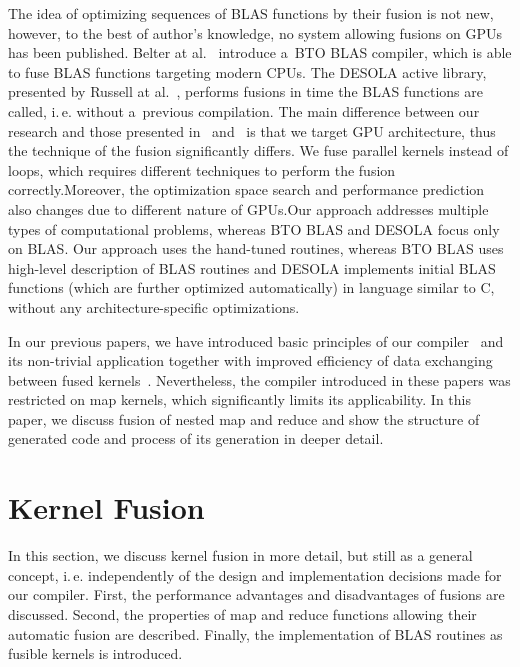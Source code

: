 \documentclass[final]{siamltex}
\def\ie{i.\,e.}
\begin{document}
The idea of optimizing sequences of BLAS functions by their fusion is not new, however, to the best of author's knowledge, no system allowing fusions on GPUs has been published. Belter at al.~\cite{belter2009automating} introduce a~BTO BLAS compiler, which is able to fuse BLAS functions targeting modern CPUs. The DESOLA active library, presented by Russell at al.~\cite{russell2011desola}, performs fusions  in time the BLAS functions are called, \ie{} without a~previous compilation. The main difference between our research and those presented in~\cite{belter2009automating} and~\cite{russell2011desola} is that we target GPU architecture, thus the technique of the fusion significantly differs. We fuse parallel kernels instead of loops, which requires different techniques to perform the fusion correctly.Moreover, the optimization space search and performance prediction also changes due to different nature of GPUs.Our approach addresses multiple types of computational problems, whereas BTO BLAS and DESOLA focus only on BLAS. Our approach uses the hand-tuned routines, whereas BTO BLAS uses high-level description of BLAS routines and DESOLA implements initial BLAS functions (which are further optimized automatically) in language similar to C, without any architecture-specific optimizations.

In our previous papers, we have introduced basic principles of our compiler~\cite{fousek2011automatic} and its non-trivial application together with improved efficiency of data exchanging between fused kernels~\cite{filipovic2012automatically}. Nevertheless, the compiler introduced in these papers was restricted on map kernels, which significantly limits its applicability. In this paper, we discuss fusion of nested map and reduce and show the structure of generated code and process of its generation in deeper detail.

\section{Kernel Fusion}
\label{sect:kerfus}

In this section, we discuss kernel fusion in more detail, but still as a  general concept, \ie{} independently of the design and implementation decisions made for our compiler. First, the performance advantages and disadvantages of fusions are discussed. Second, the properties of map and reduce functions allowing their automatic fusion are described. Finally, the implementation of BLAS routines as fusible kernels is introduced.
\end{document}
